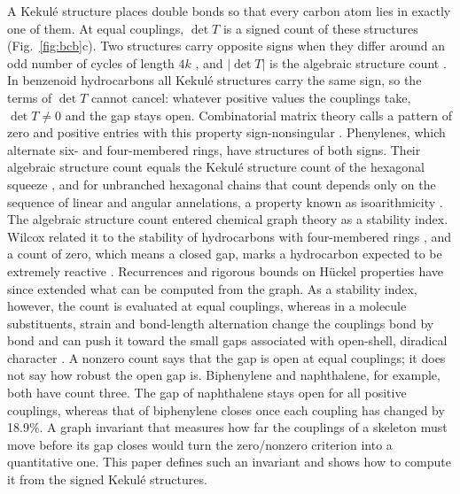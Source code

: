 \documentclass[11pt]{article}
\begin{document}
A Kekul\'e structure places double bonds so that every carbon atom lies in exactly one of them. At equal couplings, $\det T$ is a signed count of these structures (Fig.~\ref{fig:bcb}c). Two structures carry opposite signs when they differ around an odd number of cycles of length $4k$ \citep{DewarLH1952}, and $|\det T|$ is the algebraic structure count \citep{Wilcox1968,Wilcox1969}. In benzenoid hydrocarbons all Kekul\'e structures carry the same sign, so the terms of $\det T$ cannot cancel: whatever positive values the couplings take, $\det T\neq0$ and the gap stays open. Combinatorial matrix theory calls a pattern of zero and positive entries with this property sign-nonsingular \citep{BrualdiShader1995}. Phenylenes, which alternate six- and four-membered rings, have structures of both signs. Their algebraic structure count equals the Kekul\'e structure count of the hexagonal squeeze \citep{Gutman1993}, and for unbranched hexagonal chains that count depends only on the sequence of linear and angular annelations, a property known as isoarithmicity \citep{GordonDavison1952,BalabanTomescu1983}. The algebraic structure count entered chemical graph theory as a stability index. Wilcox related it to the stability of hydrocarbons with four-membered rings \citep{Wilcox1968,Wilcox1969}, and a count of zero, which means a closed gap, marks a hydrocarbon expected to be extremely reactive \citep{BodrozaPantic2007}. Recurrences \citep{BodrozaPantic2004,BodrozaPantic2007} and rigorous bounds on H\"uckel properties \citep{FowlerPickup2024} have since extended what can be computed from the graph. As a stability index, however, the count is evaluated at equal couplings, whereas in a molecule substituents, strain and bond-length alternation change the couplings bond by bond and can push it toward the small gaps associated with open-shell, diradical character \citep{MolesQuintero2022}. A nonzero count says that the gap is open at equal couplings; it does not say how robust the open gap is. Biphenylene and naphthalene, for example, both have count three. The gap of naphthalene stays open for all positive couplings, whereas that of biphenylene closes once each coupling has changed by 18.9\%. A graph invariant that measures how far the couplings of a skeleton must move before its gap closes would turn the zero/nonzero criterion into a quantitative one. This paper defines such an invariant and shows how to compute it from the signed Kekul\'e structures.
\end{document}
